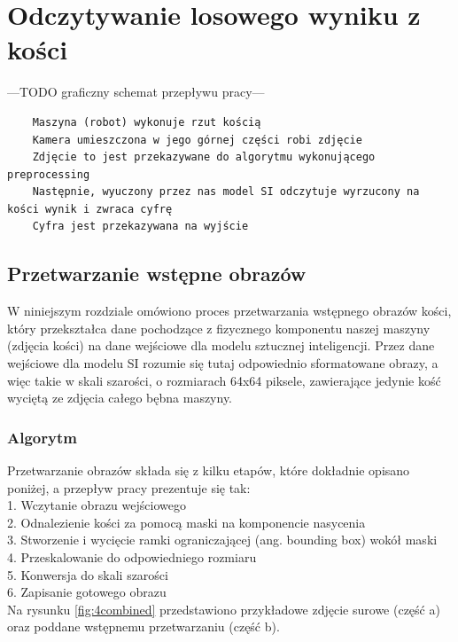 \chapter{Odczytywanie losowego wyniku z kości}

---TODO graficzny schemat przepływu pracy---
\begin{verbatim}
    Maszyna (robot) wykonuje rzut kością
    Kamera umieszczona w jego górnej części robi zdjęcie
    Zdjęcie to jest przekazywane do algorytmu wykonującego preprocessing
    Następnie, wyuczony przez nas model SI odczytuje wyrzucony na kości wynik i zwraca cyfrę
    Cyfra jest przekazywana na wyjście
\end{verbatim}

\section{Przetwarzanie wstępne obrazów}

W niniejszym rozdziale omówiono proces przetwarzania wstępnego obrazów kości,
który przekształca dane pochodzące z fizycznego komponentu naszej maszyny (zdjęcia kości) na dane wejściowe dla modelu sztucznej inteligencji.
Przez dane wejściowe dla modelu SI rozumie się tutaj odpowiednio sformatowane obrazy, a więc takie w skali szarości,
o rozmiarach 64x64 piksele, zawierające jedynie kość wyciętą ze zdjęcia całego bębna maszyny.

\subsection{Algorytm}

Przetwarzanie obrazów składa się z kilku etapów, które dokładnie opisano poniżej, a przepływ pracy prezentuje się tak: \\
1. Wczytanie obrazu wejściowego \\
2. Odnalezienie kości za pomocą maski na komponencie nasycenia \\
3. Stworzenie i wycięcie ramki ograniczającej (ang. bounding box) wokół maski \\
4. Przeskalowanie do odpowiedniego rozmiaru \\
5. Konwersja do skali szarości \\
6. Zapisanie gotowego obrazu \\

Na rysunku \ref{fig:4combined} przedstawiono przykładowe zdjęcie surowe (część a)
oraz poddane wstępnemu przetwarzaniu (część b).






